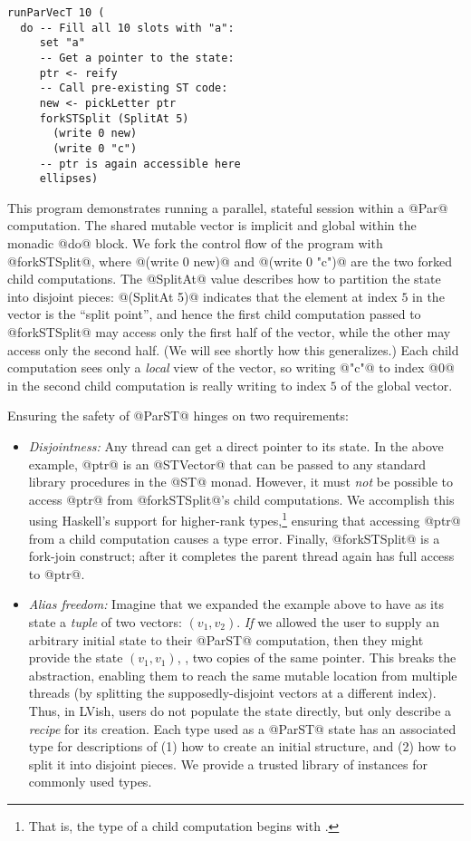 \singlespacing
\begin{lstlisting}
runParVecT 10 (
  do -- Fill all 10 slots with "a":
     set "a"
     -- Get a pointer to the state:
     ptr <- reify 
     -- Call pre-existing ST code:
     new <- pickLetter ptr
     forkSTSplit (SplitAt 5)
       (write 0 new)
       (write 0 "c")
     -- ptr is again accessible here
     ellipses)
\end{lstlisting}
\doublespacing

This program demonstrates running a parallel, stateful session within
a @Par@ computation.  The shared mutable vector is implicit and global
within the monadic @do@ block.  We fork the control flow of the
program with @forkSTSplit@, where @(write 0 new)@ and @(write 0 "c")@
are the two forked child computations.  The @SplitAt@ value describes
how to partition the state into disjoint pieces: @(SplitAt 5)@
indicates that the element at index $5$ in the vector is the ``split
point'', and hence the first child computation passed to @forkSTSplit@
may access only the first half of the vector, while the other may
access only the second half.  (We will see shortly how this
generalizes.)  Each child computation sees only a \emph{local} view of
the vector, so writing @"c"@ to index @0@ in the second child
computation is really writing to index $5$ of the global vector.

Ensuring the safety of @ParST@ hinges on two requirements:

\begin{itemize}
\item \emph{Disjointness:} Any thread can get a direct pointer to its
  state.  In the above example, @ptr@ is an @STVector@ that can be
  passed to any standard library procedures in the @ST@ monad.
  However, it must \emph{not} be possible to access @ptr@ from
  @forkSTSplit@'s child computations.  We accomplish this using
  Haskell's support for higher-rank types,\footnote{That is, the type
    of a child computation begins with .} ensuring that accessing @ptr@ from a child
  computation causes a type error.  Finally, @forkSTSplit@ is a
  fork-join construct; after it completes the parent thread again has
  full access to @ptr@.

\item \emph{Alias freedom:} Imagine that we expanded the example above
  to have as its state a \emph{tuple} of two vectors: $(v_1,v_2)$.
  \emph{If} we allowed the user to supply an arbitrary initial state
  to their @ParST@ computation, then they might provide the state
  $(v_1, v_1)$, \ie, two copies of the same pointer.  This breaks the
  abstraction, enabling them to reach the same mutable location from
  multiple threads (by splitting the supposedly-disjoint vectors at a
  different index).  Thus, in LVish, users do not populate the state
  directly, but only describe a \emph{recipe} for its creation.  Each
  type used as a @ParST@ state has an associated type for descriptions
  of (1) how to create an initial structure, and (2) how to split it
  into disjoint pieces.  We provide a trusted library of instances for
  commonly used types.
\end{itemize}

